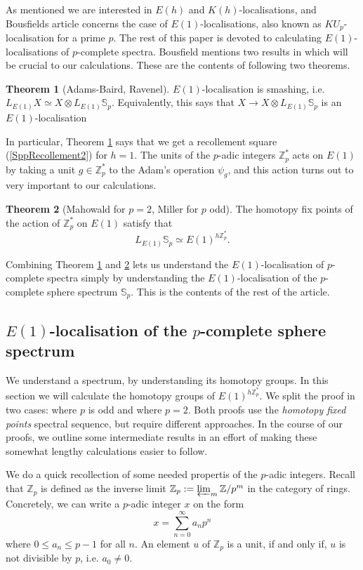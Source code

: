 \documentclass[a4paper]{article} %
\theoremstyle{definition}
\newtheorem{theorem}{Theorem} %
\newcommand{\Z}{\mathbb{Z}}
\begin{document}
As mentioned we are interested in $E(h)$ and $K(h)$-localisations, and Bousfields article \cite{bousfield1979localization} concerns the case of $E(1)$-localisations, also known as $KU_p$-localisation for a prime $p$. The rest of this paper is devoted to calculating $E(1)$-localisations of $p$-complete spectra. Bousfield mentions two results in \cite{bousfield1979localization} which will be crucial to our calculations. These are the contents of following two theorems.
\begin{theorem}[Adams-Baird, Ravenel]\label{Adams-Baird, Ravenel}
  $E(1)$-localisation is smashing, i.e. $L_{E(1)}X \simeq X \otimes L_{E(1)} \mathbb{S}_p$. Equivalently, this says that $X \to X \otimes L_{E(1)} \mathbb{S}_p$ is an $E(1)$-localisation
\end{theorem}
In particular, Theorem \ref{Adams-Baird, Ravenel} says that we get a recollement square (\ref{SppRecollement2}) for $h=1$. The units of the $p$-adic integers $\Z_p^*$ acts on $E(1)$ by taking a unit $g \in \Z_p^*$ to the Adam's operation $\psi_g$, and this action turns out to very important to our calculations.
\begin{theorem}[Mahowald for $p=2$, Miller for $p$ odd]\label{Mahowald, Miller}
   The homotopy fix points of the action of $\Z_p^*$ on $E(1)$ satisfy that
     $$L_{E(1)}\mathbb{S}_p \simeq E(1)^{h\Z_p^*}.$$
\end{theorem}
Combining Theorem \ref{Adams-Baird, Ravenel} and \ref{Mahowald, Miller} lets us understand the $E(1)$-localisation of $p$-complete spectra simply by understanding the $E(1)$-localisation of the $p$-complete sphere spectrum $\mathbb{S}_p$. This is the contents of the rest of the article.

\subsection{$E(1)$-localisation of the $p$-complete sphere spectrum}

We understand a spectrum, by understanding its homotopy groups. In this section we will calculate the homotopy groups of $E(1)^{h\Z_p^*}$. We split the proof in two cases: where $p$ is odd and where $p=2$. Both proofs use the \textit{homotopy fixed points} spectral sequence, but require different approaches. In the course of our proofs, we outline some intermediate results in an effort of making these somewhat lengthy calculations easier to follow.

We do a quick recollection of some needed propertis of the $p$-adic integers. Recall that $\Z_p$ is defined as the inverse limit $\Z_p := \varprojlim_m \Z/p^m$ in the category of rings. Concretely, we can write a $p$-adic integer $x$ on the form
\[
  x=\sum_{n = 0}^\infty a_n p^n
\]
where $ 0 \le a_n \le p-1$ for all $n$.
An element $u$ of $\Z_p$ is a unit, if and only if, $u$ is not divisible by $p$, i.e. $a_0 \neq 0$.
\end{document}
